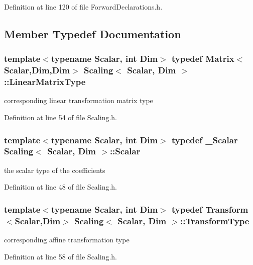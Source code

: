 Definition at line 120 of file Forward\-Declarations.\-h.



\subsection{Member Typedef Documentation}
\hypertarget{class_scaling_a6c8c9048c2ccf7378efb46c075ec7333}{
\subsubsection[{Linear\-Matrix\-Type}]{\setlength{\rightskip}{0pt plus 5cm}template$<$typename Scalar, int Dim$>$ typedef {\bf Matrix}$<${\bf Scalar},Dim,Dim$>$ {\bf Scaling}$<$ {\bf Scalar}, Dim $>$\-::{\bf Linear\-Matrix\-Type}}}\label{class_scaling_a6c8c9048c2ccf7378efb46c075ec7333}
corresponding linear transformation matrix type 

Definition at line 54 of file Scaling.\-h.

\hypertarget{class_scaling_a3e27d3992328c2ebeb624ddc129659d1}{
\subsubsection[{Scalar}]{\setlength{\rightskip}{0pt plus 5cm}template$<$typename Scalar, int Dim$>$ typedef \-\_\-\-Scalar {\bf Scaling}$<$ {\bf Scalar}, Dim $>$\-::{\bf Scalar}}}\label{class_scaling_a3e27d3992328c2ebeb624ddc129659d1}
the scalar type of the coefficients 

Definition at line 48 of file Scaling.\-h.

\hypertarget{class_scaling_acee313a178d65c86e0de34b9b9cc4f7f}{
\subsubsection[{Transform\-Type}]{\setlength{\rightskip}{0pt plus 5cm}template$<$typename Scalar, int Dim$>$ typedef {\bf Transform}$<${\bf Scalar},Dim$>$ {\bf Scaling}$<$ {\bf Scalar}, Dim $>$\-::{\bf Transform\-Type}}}\label{class_scaling_acee313a178d65c86e0de34b9b9cc4f7f}
corresponding affine transformation type 

Definition at line 58 of file Scaling.\-h.

